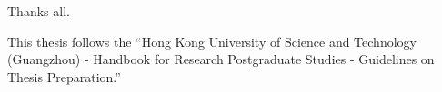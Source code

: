 
Thanks all.

This thesis follows the ``Hong Kong University of Science and Technology (Guangzhou) - Handbook for Research Postgraduate Studies - Guidelines on Thesis Preparation\citep{ust_thesis_guidelines, ust_thesis_mphil}.''
